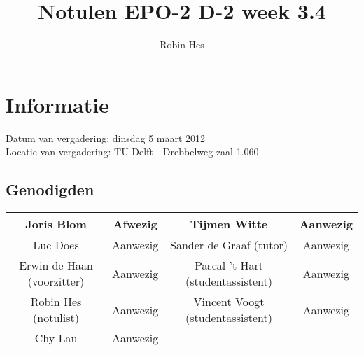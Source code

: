 \documentclass{article}
\begin{document}
\title{Notulen EPO-2 D-2 week 3.4}
\author{Robin Hes}
\maketitle
\section*{Informatie}
Datum van vergadering: dinsdag 5 maart 2012 \\
Locatie van vergadering: TU Delft - Drebbelweg zaal 1.060
\subsection*{Genodigden}
\begin{center}
\begin{tabular}{|c |c |c |c |}
	\hline
	Joris Blom & Afwezig & Tijmen Witte & Aanwezig \\
	\hline
	Luc Does & Aanwezig & Sander de Graaf (tutor) & Aanwezig \\
	\hline
	Erwin de Haan (voorzitter) & Aanwezig & Pascal 't Hart (studentassistent) & Aanwezig \\
	\hline
	Robin Hes (notulist) & Aanwezig & Vincent Voogt (studentassistent) & Aanwezig \\
	\hline
	Chy Lau & Aanwezig & & \\
	\hline
\end{tabular}
\end{center}
\end{document}
